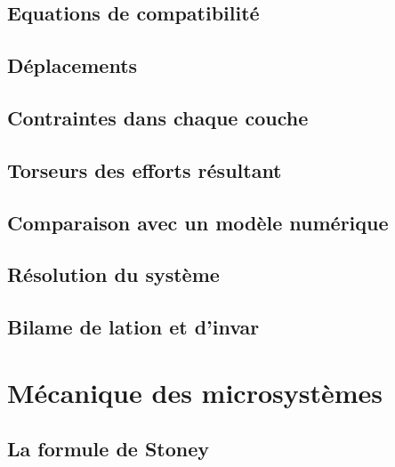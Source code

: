 \documentclass{beamer}
\begin{document}
\subsection{Equations de compatibilité} 
\subsection{Déplacements} 
\subsection{Contraintes dans chaque couche} 
\subsection{Torseurs des efforts résultant} 
\subsection{Comparaison avec un modèle numérique} 
\subsection{Résolution du système}
\subsection{Bilame de lation et d'invar} 

\section{Mécanique des microsystèmes} %

\subsection{La formule de Stoney} %
\end{document}
